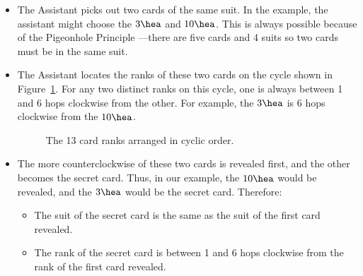 \begin{itemize}

\item The Assistant picks out two cards of the same suit.  In the
example, the assistant might choose the $3 \hea$ and $10 \hea$.  This
is always possible because of the Pigeonhole Principle ---there are
five cards and 4 suits so two cards must be in the same suit.

\item The Assistant locates the ranks of these two cards on the cycle
  shown in Figure~\ref{fig:11Q11}. For any two distinct ranks on this
  cycle, one is always between 1 and 6 hops clockwise from the other.
  For example, the $3 \hea$ is 6 hops clockwise from the $10 \hea$.


\begin{figure}


\caption{The 13 card ranks arranged in cyclic order.}

\label{fig:11Q11}

\end{figure}

\item The more counterclockwise of these two cards is revealed first,
and the other becomes the secret card.  Thus, in our example, the $10
\hea$ would be revealed, and the $3 \hea$ would be the secret card.
Therefore:

\begin{itemize}

\item The suit of the secret card is the same as the suit of the first
card revealed.

\item The rank of the secret card is between 1 and 6 hops clockwise
from the rank of the first card revealed.

\end{itemize}


\end{itemize}
